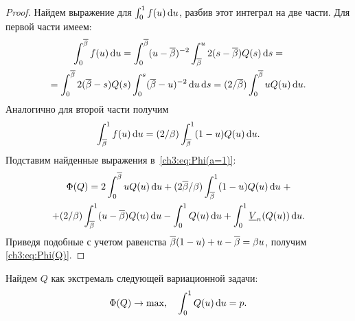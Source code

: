 {\begin{proof}
  Найдем выражение для $\int_0^1 f(u) \mathop{}\!\mathrm{d} u$, разбив этот интеграл на две части.
  Для первой части имеем:
  \begin{multline*}
    \int_0^{{{\overline{\beta}}}} f(u) \mathop{}\!\mathrm{d} u = \int_0^{{{\overline{\beta}}}} (u - {{\overline{\beta}}})^{-2} \int_{{{\overline{\beta}}}}^u 2(s - {{\overline{\beta}}}) Q(s) \mathop{}\!\mathrm{d} s = \\
    = \int_0^{{{\overline{\beta}}}} 2 ({{\overline{\beta}}} - s) Q(s) \int_0^s ({{\overline{\beta}}} - u)^{-2} \mathop{}\!\mathrm{d} u \mathop{}\!\mathrm{d} s =
    (2/{{\overline{\beta}}}) \int_0^{{{\overline{\beta}}}} u Q(u) \mathop{}\!\mathrm{d} u.
  \end{multline*}
  Аналогично для второй части получим
  \begin{gather*}
    \int_{{{\overline{\beta}}}}^1 f(u) \mathop{}\!\mathrm{d} u = (2/\beta) \int_{{{\overline{\beta}}}}^1 (1-u) Q(u) \mathop{}\!\mathrm{d} u.
  \end{gather*}
  Подставим найденные выражения в~\eqref{ch3:eq:Phi(a=1)}:
  \begin{multline*}
    \Phi(Q) = 2 \int_0^\DCo u Q(u) \di u + (2\DCo/\Co) \int_\DCo^1 (1-u) Q(u) \di u \; + \\
    + (2/\Co) \int_\DCo^1 (u - \DCo) Q(u) \di u - \int_0^1 Q(u) \di u + \int_0^1
    \LV{n}(Q(u)) \di u.
  \end{multline*}
  Приведя подобные с учетом равенства ${{\overline{\beta}}} (1-u) + u - {{\overline{\beta}}} = \beta u$, получим
  \eqref{ch3:eq:Phi(Q)}.
\end{proof}

Найдем $Q$ как экстремаль следующей вариационной задачи:
\begin{align}
  \label{ch3:eq:Q-Problem}
  \Phi(Q) \rightarrow \max, \quad
  \int_0^1 Q(u) \mathop{}\!\mathrm{d} u = p.
\end{align}

}
